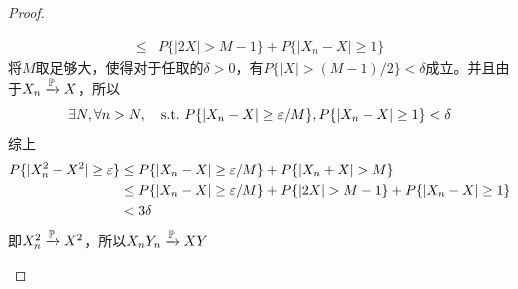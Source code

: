 \begin{proof}
\begin{enumerate}
\begin{align*}
                  \le                & P\{|2 X|>M-1\}+P\{|X_n-X| \ge 1\}
              \end{align*}
              将$M$取足够大，使得对于任取的$\delta >0$，有$P\{ |X| > (M-1) / 2 \}< \delta$成立。并且由于$X_n \xrightarrow{\P} X$，所以
              \[ \exists N, \forall n>N \st P\{|X_n-X| \ge \e / M\},P\{|X_n-X| \ge 1\} < \delta \]
              综上
              \begin{align*}
                  P\{|X_n^2-X^2| \ge \e \} & \le P\{|X_n-X| \ge \e / M\}+P\{|X_n+X|>M\}                      \\
                                           & \le P\{|X_n-X| \ge \e / M\} + P\{|2 X|>M-1\}+P\{|X_n-X| \ge 1\} \\
                                           & < 3\delta
              \end{align*}
              即$X_n^2 \xrightarrow{\P} X^2$，所以$X_n Y_n \xrightarrow{\P} XY$
    \end{enumerate}
\end{proof}

